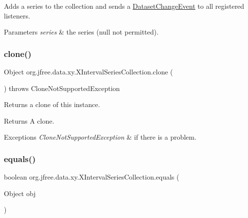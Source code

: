 Adds a series to the collection and sends a \mbox{\hyperlink{}{Dataset\+Change\+Event}} to all registered listeners.


\begin{DoxyParams}{Parameters}
{\em series} & the series ({\ttfamily null} not permitted). \\
\hline
\end{DoxyParams}
\mbox{\label{classorg_1_1jfree_1_1data_1_1xy_1_1_x_interval_series_collection_aeb5828647df709d6be050259d9dfde45}} 
\subsubsection{\texorpdfstring{clone()}{clone()}}
{\footnotesize\ttfamily Object org.\+jfree.\+data.\+xy.\+X\+Interval\+Series\+Collection.\+clone (\begin{DoxyParamCaption}{ }\end{DoxyParamCaption}) throws Clone\+Not\+Supported\+Exception}

Returns a clone of this instance.

\begin{DoxyReturn}{Returns}
A clone.
\end{DoxyReturn}

\begin{DoxyExceptions}{Exceptions}
{\em Clone\+Not\+Supported\+Exception} & if there is a problem. \\
\hline
\end{DoxyExceptions}
\mbox{\label{classorg_1_1jfree_1_1data_1_1xy_1_1_x_interval_series_collection_acb4f857f493fb079dd9236863a1a1214}} 
\subsubsection{\texorpdfstring{equals()}{equals()}}
{\footnotesize\ttfamily boolean org.\+jfree.\+data.\+xy.\+X\+Interval\+Series\+Collection.\+equals (\begin{DoxyParamCaption}\item[{Object}]{obj }\end{DoxyParamCaption})}

